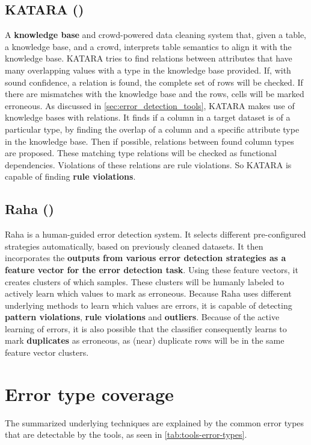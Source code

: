 \subsection{KATARA (\cite{Chu2015-fs})}
A \textbf{knowledge base} and crowd-powered data cleaning system that, given a table, a knowledge base, and a crowd, interprets table semantics to align it with the knowledge base. KATARA tries to find relations between attributes that have many overlapping values with a type in the knowledge base provided. If, with sound confidence, a relation is found, the complete set of rows will be checked. If there are mismatches with the knowledge base and the rows, cells will be marked erroneous. 
As discussed in \autoref{sec:error_detection_tools}, KATARA makes use of knowledge bases with relations. It finds if a column in a target dataset is of a particular type, by finding the overlap of a column and a specific attribute type in the knowledge base. Then if possible, relations between found column types are proposed. These matching type relations will be checked as functional dependencies. Violations of these relations are rule violations. So KATARA is capable of finding \textbf{rule violations}.

\subsection{Raha (\cite{Mahdavi2019-zf})}
Raha is a human-guided error detection system. It selects different pre-configured strategies automatically, based on previously cleaned datasets. It then incorporates the \textbf{outputs from various error detection strategies as a feature vector for the error detection task}. Using these feature vectors, it creates clusters of which samples. These clusters will be humanly labeled to actively learn which values to mark as erroneous. 
Because Raha uses different underlying methods to learn which values are errors, it is capable of detecting \textbf{pattern violations}, \textbf{rule violations} and \textbf{outliers}. Because of the active learning of errors, it is also possible that the classifier consequently learns to mark \textbf{duplicates} as erroneous, as (near) duplicate rows will be in the same feature vector clusters. 

\newpage
\section{Error type coverage}
\label{sec:error_type_coverage}
The summarized underlying techniques are explained by the common error types that are detectable by the tools, as seen in \autoref{tab:tools-error-types}.

